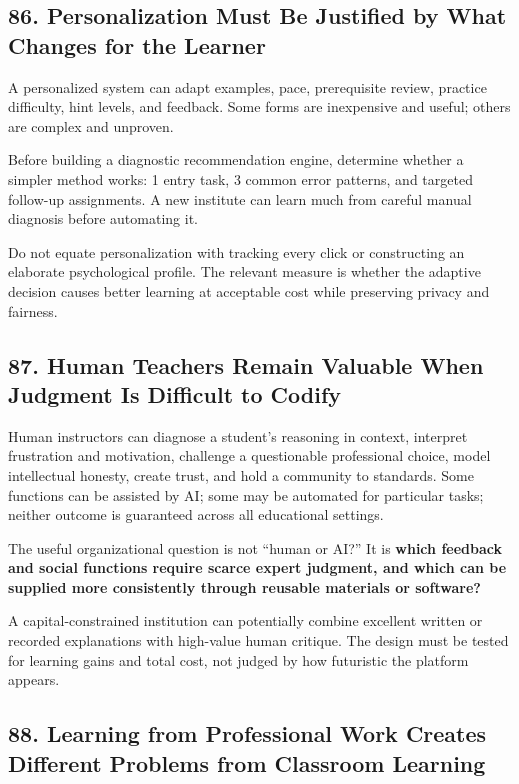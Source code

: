 \subsection*{86. Personalization Must Be Justified by What Changes for the Learner}

A personalized system can adapt examples, pace, prerequisite review, practice difficulty, hint levels, and feedback. Some forms are inexpensive and useful; others are complex and unproven.

Before building a diagnostic recommendation engine, determine whether a simpler method works: 1 entry task, 3 common error patterns, and targeted follow-up assignments. A new institute can learn much from careful manual diagnosis before automating it.

Do not equate personalization with tracking every click or constructing an elaborate psychological profile. The relevant measure is whether the adaptive decision causes better learning at acceptable cost while preserving privacy and fairness.

\subsection*{87. Human Teachers Remain Valuable When Judgment Is Difficult to Codify}

Human instructors can diagnose a student's reasoning in context, interpret frustration and motivation, challenge a questionable professional choice, model intellectual honesty, create trust, and hold a community to standards. Some functions can be assisted by AI; some may be automated for particular tasks; neither outcome is guaranteed across all educational settings.

The useful organizational question is not ``human or AI?'' It is \textbf{which feedback and social functions require scarce expert judgment, and which can be supplied more consistently through reusable materials or software?}

A capital-constrained institution can potentially combine excellent written or recorded explanations with high-value human critique. The design must be tested for learning gains and total cost, not judged by how futuristic the platform appears.

\subsection*{88. Learning from Professional Work Creates Different Problems from Classroom Learning}


